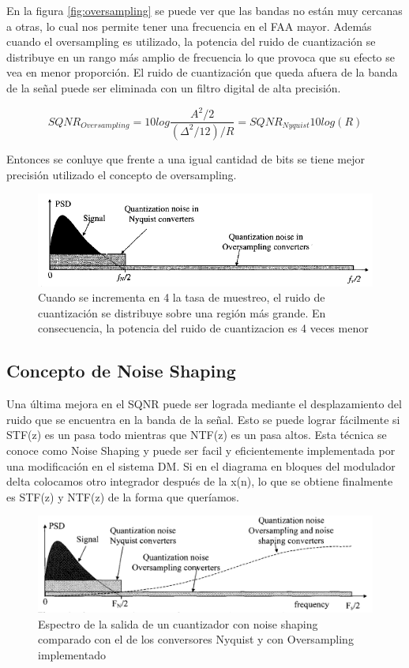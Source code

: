 \documentclass[assd_tp3_main.tex]{subfiles}
\begin{document}
En la figura \ref{fig:oversampling} se puede ver que las bandas no están muy cercanas a otras, lo cual nos permite tener una frecuencia en el FAA mayor.
Además cuando el oversampling es utilizado, la potencia del ruido de cuantización se distribuye en un rango más amplio de frecuencia lo que provoca que su efecto se vea en menor proporción.
El ruido de cuantización que queda afuera de la banda de la señal puede ser eliminada con un filtro digital de alta precisión. 

\[ SQNR_{Oversampling}=10log\frac{A^2/2}{(\Delta^2/12)/R}=SQNR_{Nyquist}10log(R) \]

Entonces se conluye que frente a una igual cantidad de bits se tiene mejor precisión utilizado el concepto de oversampling.

\begin{figure}[H]
\centering
\includegraphics[width=0.8\linewidth]{images/ej4/oversampling_noise.png}
\caption{Cuando se incrementa en 4 la tasa de muestreo, el ruido de cuantización se distribuye sobre una región más grande. En consecuencia, la potencia del ruido de cuantizacion es 4 veces menor}
\label{fig:oversampling_noise}
\end{figure}


\subsection{Concepto de Noise Shaping}
Una última mejora en el SQNR puede ser lograda mediante el desplazamiento del ruido que se encuentra en la banda de la señal. Esto se puede lograr fácilmente si STF(z) es un pasa todo mientras que NTF(z) es un pasa altos.
Esta técnica se conoce como Noise Shaping y puede ser facil y eficientemente implementada por una modificación en el sistema DM. Si en el diagrama en bloques del modulador delta colocamos otro integrador después de la x(n), lo que se obtiene finalmente es STF(z) y NTF(z) de la forma que queríamos.
\begin{figure}[H]
\centering
\includegraphics[width=0.8\linewidth]{images/ej4/noise_shaping.png}
\caption{Espectro de la salida de un cuantizador con noise shaping comparado con el de los conversores Nyquist y con Oversampling implementado }
\label{fig:noise_shaping}
\end{figure}
\end{document}
